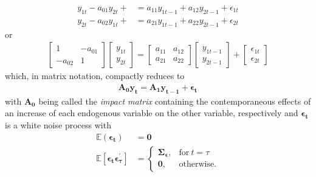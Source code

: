 \documentclass[a4paper,11pt,listof=nochaptergap,oneside,pointednumbers,bibtotoc,bigheadings,liststotoc]{scrbook}
\theoremstyle{mysatz}
\theoremstyle{mydefinition}
\theoremstyle{mybemerkung}
\newcommand{\vect}[1]{\boldsymbol{\mathbf{#1}}}
\begin{document}
\begin{itemize}
\begin{equation}
\begin{split}
	y_{1t} - a_{01}y_{2t} + & = a_{11}y_{1t-1} + a_{12}y_{2t-1} + \epsilon_{1t} \\
	y_{2t} - a_{02}y_{1t} +  & = a_{21}y_{1t-1} + a_{22}y_{2t-1} + \epsilon_{2t}
\end{split}								
\end{equation}
or 
\begin{equation} \label{eq:svar3}
\begin{split}
	\begin{bmatrix}
    	1 & -a_{01} \\
    	-a_{02} & 1
 	\end{bmatrix}
	\begin{bmatrix}
    	y_{1t} \\
    	y_{2t}
 	\end{bmatrix} = 
	\begin{bmatrix}
    	a_{11} & a_{12} \\
    	a_{21} & a_{22}
 	\end{bmatrix} 
	\begin{bmatrix}
    	y_{1t-1} \\
    	y_{2t-1}
 	\end{bmatrix} +
	\begin{bmatrix}
    	\epsilon_{1t} \\
    	\epsilon_{2t}
 	\end{bmatrix} 
\end{split}								
\end{equation}
which, in matrix notation, compactly reduces to 
\begin{equation} \label{eq:svar4}
\begin{split}
	\vect{A_0 y_t} = \vect{A_1}\vect{y_{t-1}} + \vect{\epsilon_t}
\end{split}								
\end{equation}
with $\vect{A_0}$ being called the \textit{impact matrix} containing the contemporaneous effects of an increase of each endogenous variable on the other variable, respectively and $\vect{\epsilon_t}$ is a white noise process with
\begin{equation}
\begin{split}
	\mathbb{E}(\vect{\epsilon_t}) &  = \vect{0}  \\
	\mathbb{E}[\vect{\epsilon_t}\vect{\epsilon_{\tau}^'}]  & =     \begin{cases}
      												\vect{\Sigma_\epsilon}, & \text{for}\ t = \tau \\
      												\vect{0}, & \text{otherwise.}
   								  \end{cases}
\end{split}								
\end{equation}


\end{itemize}
\end{document}
